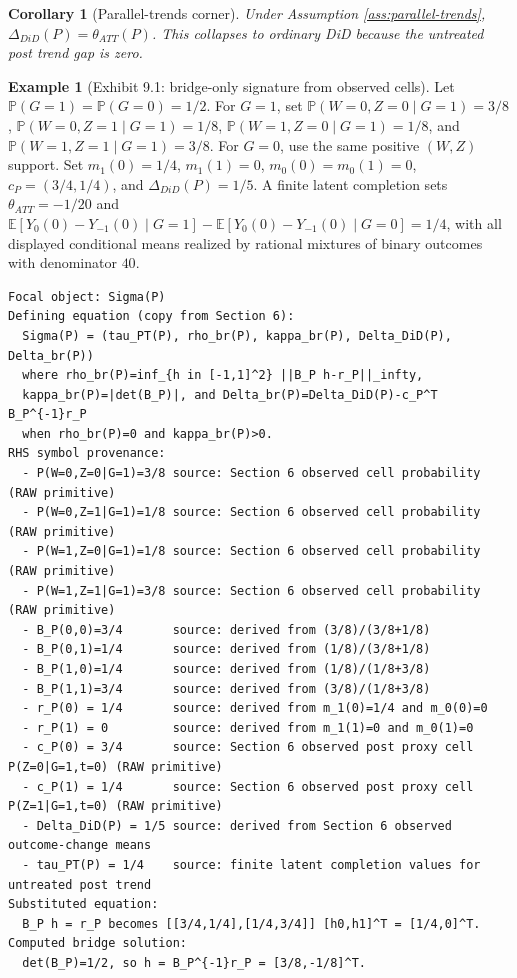 \documentclass[11pt]{article}
\newcommand{\E}{\mathbb{E}}
\renewcommand{\Pr}{\mathbb{P}}
\theoremstyle{definition}
\newtheorem{example}{Example}
\theoremstyle{plain}
\newtheorem{corollary}{Corollary}
\theoremstyle{remark}
\begin{document}
\begin{corollary}[Parallel-trends corner]
Under Assumption \ref{ass:parallel-trends}, \(\Delta_{DiD}(P)=\theta_{ATT}(P)\). This collapses to ordinary DiD because the untreated post trend gap is zero.
\end{corollary}

\begin{example}[Exhibit 9.1: bridge-only signature from observed cells]
Let \(\Pr(G=1)=\Pr(G=0)=1/2\). For \(G=1\), set \(\Pr(W=0,Z=0\mid G=1)=3/8\), \(\Pr(W=0,Z=1\mid G=1)=1/8\), \(\Pr(W=1,Z=0\mid G=1)=1/8\), and \(\Pr(W=1,Z=1\mid G=1)=3/8\). For \(G=0\), use the same positive \((W,Z)\) support. Set \(m_1(0)=1/4\), \(m_1(1)=0\), \(m_0(0)=m_0(1)=0\), \(c_P=(3/4,1/4)\), and \(\Delta_{DiD}(P)=1/5\). A finite latent completion sets \(\theta_{ATT}=-1/20\) and \(\E[Y_0(0)-Y_{-1}(0)\mid G=1]-\E[Y_0(0)-Y_{-1}(0)\mid G=0]=1/4\), with all displayed conditional means realized by rational mixtures of binary outcomes with denominator \(40\).
\begin{verbatim}
Focal object: Sigma(P)
Defining equation (copy from Section 6):
  Sigma(P) = (tau_PT(P), rho_br(P), kappa_br(P), Delta_DiD(P), Delta_br(P))
  where rho_br(P)=inf_{h in [-1,1]^2} ||B_P h-r_P||_infty,
  kappa_br(P)=|det(B_P)|, and Delta_br(P)=Delta_DiD(P)-c_P^T B_P^{-1}r_P
  when rho_br(P)=0 and kappa_br(P)>0.
RHS symbol provenance:
  - P(W=0,Z=0|G=1)=3/8 source: Section 6 observed cell probability (RAW primitive)
  - P(W=0,Z=1|G=1)=1/8 source: Section 6 observed cell probability (RAW primitive)
  - P(W=1,Z=0|G=1)=1/8 source: Section 6 observed cell probability (RAW primitive)
  - P(W=1,Z=1|G=1)=3/8 source: Section 6 observed cell probability (RAW primitive)
  - B_P(0,0)=3/4       source: derived from (3/8)/(3/8+1/8)
  - B_P(0,1)=1/4       source: derived from (1/8)/(3/8+1/8)
  - B_P(1,0)=1/4       source: derived from (1/8)/(1/8+3/8)
  - B_P(1,1)=3/4       source: derived from (3/8)/(1/8+3/8)
  - r_P(0) = 1/4       source: derived from m_1(0)=1/4 and m_0(0)=0
  - r_P(1) = 0         source: derived from m_1(1)=0 and m_0(1)=0
  - c_P(0) = 3/4       source: Section 6 observed post proxy cell P(Z=0|G=1,t=0) (RAW primitive)
  - c_P(1) = 1/4       source: Section 6 observed post proxy cell P(Z=1|G=1,t=0) (RAW primitive)
  - Delta_DiD(P) = 1/5 source: derived from Section 6 observed outcome-change means
  - tau_PT(P) = 1/4    source: finite latent completion values for untreated post trend
Substituted equation:
  B_P h = r_P becomes [[3/4,1/4],[1/4,3/4]] [h0,h1]^T = [1/4,0]^T.
Computed bridge solution:
  det(B_P)=1/2, so h = B_P^{-1}r_P = [3/8,-1/8]^T.

\end{verbatim}
\end{example}
\end{document}
